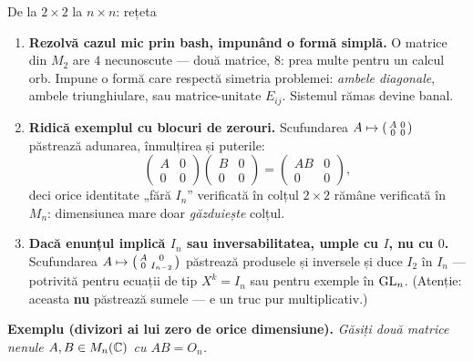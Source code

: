 \begin{tehbox}{De la $2\times2$ la $n\times n$: rețeta}
\begin{enumerate}[leftmargin=*, itemsep=2pt]
\item \textbf{Rezolvă cazul mic prin bash, impunând o formă simplă.} O matrice din $M_2$ are $4$ necunoscute --- două matrice, $8$: prea multe pentru un calcul orb. Impune o formă care respectă simetria problemei: \emph{ambele diagonale}, ambele triunghiulare, sau matrice-unitate $E_{ij}$. Sistemul rămas devine banal.
\item \textbf{Ridică exemplul cu blocuri de zerouri.} Scufundarea $A\mapsto\begin{psmallmatrix}A&0\\0&0\end{psmallmatrix}$ păstrează adunarea, înmulțirea și puterile:
\[
\begin{pmatrix}A&0\\0&0\end{pmatrix}\begin{pmatrix}B&0\\0&0\end{pmatrix}=\begin{pmatrix}AB&0\\0&0\end{pmatrix},
\]
deci orice identitate „fără $I_n$'' verificată în colțul $2\times2$ rămâne verificată în $M_n$: dimensiunea mare doar \emph{găzduiește} colțul.
\item \textbf{Dacă enunțul implică $I_n$ sau inversabilitatea, umple cu $I$, nu cu $0$.} Scufundarea $A\mapsto\begin{psmallmatrix}A&0\\0&I_{n-2}\end{psmallmatrix}$ păstrează produsele și inversele și duce $I_2$ în $I_n$ --- potrivită pentru ecuații de tip $X^k=I_n$ sau pentru exemple în $\mathrm{GL}_n$. (Atenție: aceasta \textbf{nu} păstrează sumele --- e un truc pur multiplicativ.)
\end{enumerate}
\end{tehbox}

\textbf{Exemplu (divizori ai lui zero de orice dimensiune).} \emph{Găsiți două matrice nenule $A,B\in M_n(\mathbb{C})$ cu $AB=O_n$.}

